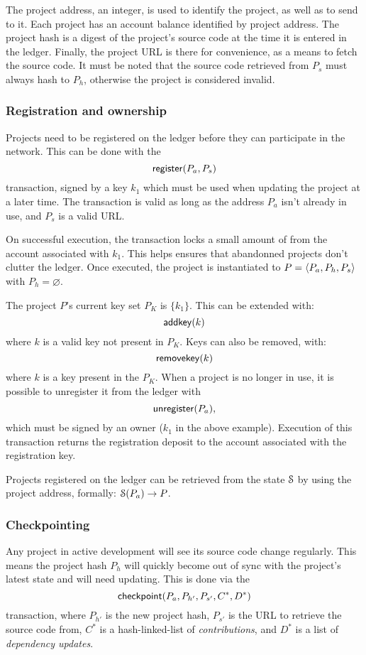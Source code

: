 The project address, an integer, is used to identify the project, as
well as to send \oscoin{} to it. Each project has an account balance
identified by project address. The project hash is a digest of the
project's source code at the time it is entered in the
ledger. Finally, the project URL is there for convenience, as a means
to fetch the source code.  It must be noted that the source code
retrieved from $P_s$ must always hash to $P_h$, otherwise the project
is considered invalid.

\subsubsection{Registration and ownership} Projects need to be
registered on the ledger before they can participate in the
network. This can be done with the
\[
    \mathsf{register}\lparen P_a, P_s\rparen
\]
transaction, signed by a key $k_1$ which must be used when updating the project
at a later time. The transaction is valid as long as the address $P_a$ isn't
already in use, and $P_s$ is a valid URL.

On successful execution, the transaction locks a small amount of \oscoin{} from
the account associated with $k_1$. This helps ensures that abandonned projects
don't clutter the ledger.  Once executed, the project is instantiated to $P =
\langle P_a, P_h, P_s\rangle$ with $P_h = \varnothing$.

The project $P$'s current key set $P_K$ is $\{k_1\}$. This can be extended
with:
\[
    \mathsf{addkey}\lparen k\rparen
\]
where $k$ is a valid key not present in $P_K$. Keys can also be removed, with:
\[
    \mathsf{removekey}\lparen k\rparen
\]
where $k$ is a key present in the $P_K$.
When a project is no longer in use, it is possible to unregister it from the
ledger with
\[
    \mathsf{unregister}\lparen P_a\rparen,
\]
which must be signed by an owner ($k_1$ in the above example).
Execution of this transaction returns the registration deposit to the account
associated with the registration key.

Projects registered on the ledger can be retrieved from the state $\mathcal{S}$ by
using the project address, formally: $\mathcal{S}(P_a) \to P$.

\subsubsection{Checkpointing} \label{s:checkpointing} Any project in active
development will see its source code change regularly. This means the project
hash $P_h$ will quickly become out of sync with the project's latest state and
will need updating. This is done via the
\[
    \mathsf{checkpoint}\lparen P_a, P_{h'}, P_{s'}, C^*, D^*\rparen
\]
transaction, where $P_{h'}$ is the new project hash, $P_{s'}$ is the URL to
retrieve the source code from, $C^*$ is a hash-linked-list of
\emph{contributions}, and $D^*$ is a list of \emph{dependency updates}.

